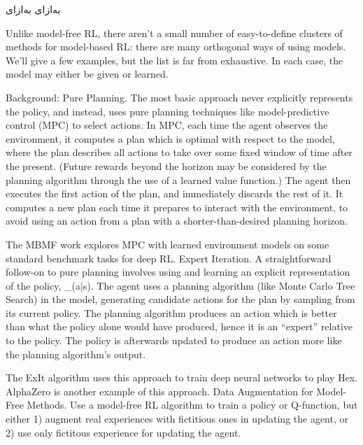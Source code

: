 ‌به‌ازای
‌به‌ازای



Unlike model-free RL, there aren’t a small number of easy-to-define clusters of methods for model-based RL: there are many orthogonal ways of using models. We’ll give a few examples, but the list is far from exhaustive. In each case, the model may either be given or learned.

Background: Pure Planning. The most basic approach never explicitly represents the policy, and instead, uses pure planning techniques like model-predictive control (MPC) to select actions. In MPC, each time the agent observes the environment, it computes a plan which is optimal with respect to the model, where the plan describes all actions to take over some fixed window of time after the present. (Future rewards beyond the horizon may be considered by the planning algorithm through the use of a learned value function.) The agent then executes the first action of the plan, and immediately discards the rest of it. It computes a new plan each time it prepares to interact with the environment, to avoid using an action from a plan with a shorter-than-desired planning horizon.

The MBMF work explores MPC with learned environment models on some standard benchmark tasks for deep RL.
Expert Iteration. A straightforward follow-on to pure planning involves using and learning an explicit representation of the policy, \pi_{\theta}(a|s). The agent uses a planning algorithm (like Monte Carlo Tree Search) in the model, generating candidate actions for the plan by sampling from its current policy. The planning algorithm produces an action which is better than what the policy alone would have produced, hence it is an “expert” relative to the policy. The policy is afterwards updated to produce an action more like the planning algorithm’s output.

The ExIt algorithm uses this approach to train deep neural networks to play Hex.
AlphaZero is another example of this approach.
Data Augmentation for Model-Free Methods. Use a model-free RL algorithm to train a policy or Q-function, but either 1) augment real experiences with fictitious ones in updating the agent, or 2) use only fictitous experience for updating the agent.

